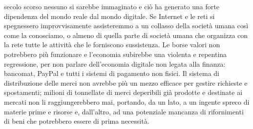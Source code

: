 secolo scorso nessuno si sarebbe immaginato e ciò ha generato una forte dipendenza del
mondo reale dal mondo digitale. Se Internet e le reti si spegnessero improvvisamente
assisteremmo a un collasso della società umana così come la conosciamo, o almeno di
quella parte di società umana che organizza con la rete tutte le attività che le forniscono
sussistenza. Le borse valori non potrebbero più funzionare e l’economia subirebbe una
violenta e repentina regressione, per non parlare dell’economia digitale non legata alla
finanza: bancomat, PayPal e tutti i sistemi di pagamento non fisici. Il sistema di distribuzione
delle merci non avrebbe più un mezzo efficace per gestire richieste e spostamenti; milioni
di tonnellate di merci deperibili già prodotte e destinate ai mercati non li raggiungerebbero
mai, portando, da un lato, a un ingente spreco di materie prime e risorse e, dall’altro, ad una
potenziale mancanza di rifornimenti di beni che potrebbero essere di prima necessità.

